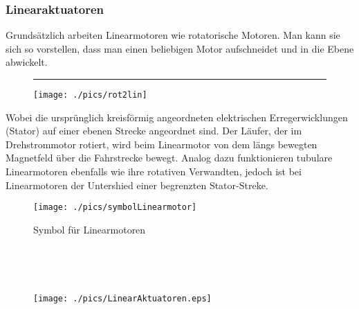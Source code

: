 			\subsubsection{Linearaktuatoren}				
				\begin{description}[leftmargin=2.5cm]
					\item[Allgemein]					
					Grundsätzlich arbeiten Linearmotoren wie rotatorische Motoren. Man kann sie sich so vorstellen, dass man einen beliebigen Motor aufschneidet und in die Ebene abwickelt.
					\leavevmode \\
					\begin{figure}[h!]
						\centering \rule{1.5cm}{0cm}
						\texttt{[image: ./pics/rot2lin]} 
					\end{figure} 
					Wobei die ursprünglich kreisförmig angeordneten elektrischen Erregerwicklungen (Stator) auf einer ebenen Strecke angeordnet sind. Der Läufer, der im Drehstrommotor rotiert, wird beim Linearmotor von dem längs bewegten Magnetfeld über die Fahrstrecke bewegt. Analog dazu funktionieren tubulare Linearmotoren ebenfalls wie ihre rotativen Verwandten, jedoch ist bei Linearmotoren der Untershied einer begrenzten Stator-Streke.
					\begin{figure}[h!]
						\centering 
						\texttt{[image: ./pics/symbolLinearmotor]}
						\caption{Symbol für Linearmotoren}
					\end{figure} \leavevmode \\

					\item[Einteilung]
					\leavevmode \\
					\begin{figure}[h!]
						\centering
						\texttt{[image: ./pics/LinearAktuatoren.eps]}
					\end{figure}
				

\end{description}

